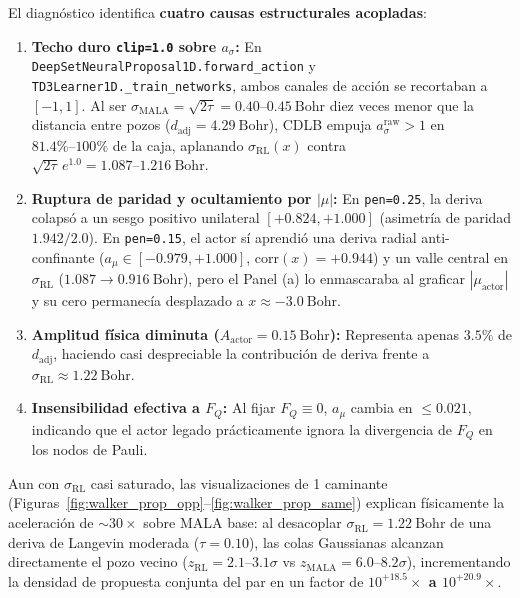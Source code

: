 \documentclass[10pt,a4paper]{article}
\begin{document}
El diagnóstico identifica \textbf{cuatro causas estructurales acopladas}:
\begin{enumerate}
\item \textbf{Techo duro \texttt{clip=1.0} sobre $a_\sigma$:} En \texttt{DeepSetNeuralProposal1D.forward\_action} y \texttt{TD3Learner1D.\_train\_networks}, ambos canales de acción se recortaban a $[-1, 1]$. Al ser $\sigma_{\mathrm{MALA}} = \sqrt{2\tau} = 0.40\text{--}0.45\ \mathrm{Bohr}$ diez veces menor que la distancia entre pozos ($d_{\mathrm{adj}} = 4.29\ \mathrm{Bohr}$), CDLB empuja $a_\sigma^{\mathrm{raw}} > 1$ en $81.4\%\text{--}100\%$ de la caja, aplanando $\sigma_{\mathrm{RL}}(x)$ contra $\sqrt{2\tau}\,e^{1.0} = 1.087\text{--}1.216\ \mathrm{Bohr}$.
\item \textbf{Ruptura de paridad y ocultamiento por $|\mu|$:} En \texttt{pen=0.25}, la deriva colapsó a un sesgo positivo unilateral $[+0.824, +1.000]$ (asimetría de paridad $1.942/2.0$). En \texttt{pen=0.15}, el actor sí aprendió una deriva radial anti-confinante ($a_\mu \in [-0.979, +1.000]$, $\mathrm{corr}(x) = +0.944$) y un valle central en $\sigma_{\mathrm{RL}}$ ($1.087 \to 0.916\ \mathrm{Bohr}$), pero el Panel (a) lo enmascaraba al graficar $|\mu_{\mathrm{actor}}|$ y su cero permanecía desplazado a $x \approx -3.0\ \mathrm{Bohr}$.
\item \textbf{Amplitud física diminuta ($A_{\mathrm{actor}} = 0.15\ \mathrm{Bohr}$):} Representa apenas $3.5\%$ de $d_{\mathrm{adj}}$, haciendo casi despreciable la contribución de deriva frente a $\sigma_{\mathrm{RL}} \approx 1.22\ \mathrm{Bohr}$.
\item \textbf{Insensibilidad efectiva a $F_Q$:} Al fijar $F_Q \equiv 0$, $a_\mu$ cambia en $\le 0.021$, indicando que el actor legado prácticamente ignora la divergencia de $F_Q$ en los nodos de Pauli.
\end{enumerate}

Aun con $\sigma_{\mathrm{RL}}$ casi saturado, las visualizaciones de 1 caminante (Figuras~\ref{fig:walker_prop_opp}--\ref{fig:walker_prop_same}) explican físicamente la aceleración de $\sim 30\times$ sobre MALA base: al desacoplar $\sigma_{\mathrm{RL}} = 1.22\ \mathrm{Bohr}$ de una deriva de Langevin moderada ($\tau = 0.10$), las colas Gaussianas alcanzan directamente el pozo vecino ($z_{\mathrm{RL}} = 2.1\text{--}3.1\sigma$ vs $z_{\mathrm{MALA}} = 6.0\text{--}8.2\sigma$), incrementando la densidad de propuesta conjunta del par en un factor de \textbf{$10^{+18.5}\times$ a $10^{+20.9}\times$}.
\end{document}
